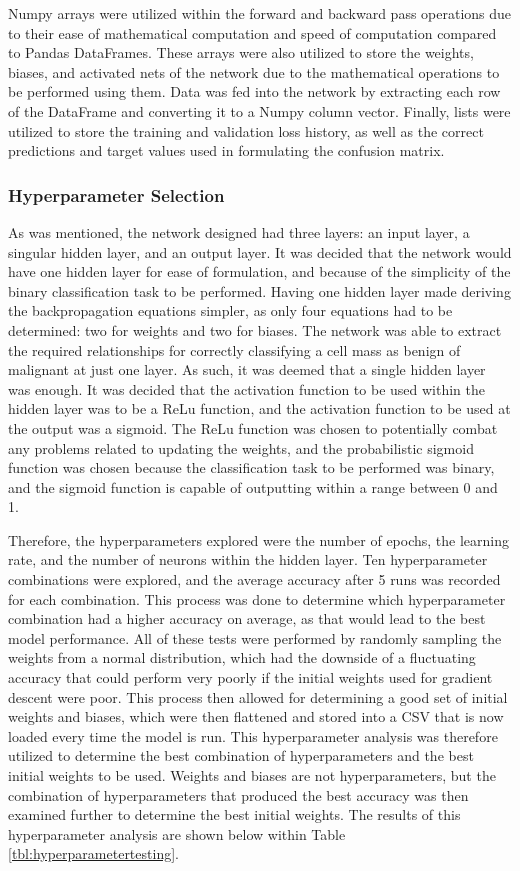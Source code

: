\documentclass[a4paper]{article}
\begin{document}
Numpy arrays were utilized within the forward and backward pass operations due to their ease of mathematical computation and speed of computation compared to Pandas DataFrames. These arrays were also utilized to store the weights, biases, and activated nets of the network due to the mathematical operations to be performed using them. Data was fed into the network by extracting each row of the DataFrame and converting it to a Numpy column vector. Finally, lists were utilized to store the training and validation loss history, as well as the correct predictions and target values used in formulating the confusion matrix.

\subsubsection{Hyperparameter Selection}\label{ANNhyperparameterselection}

As was mentioned, the network designed had three layers: an input layer, a singular hidden layer, and an output layer. It was decided that the network would have one hidden layer for ease of formulation, and because of the simplicity of the binary classification task to be performed. Having one hidden layer made deriving the backpropagation equations simpler, as only four equations had to be determined: two for weights and two for biases. The network was able to extract the required relationships for correctly classifying a cell mass as benign of malignant at just one layer. As such, it was deemed that a single hidden layer was enough. It was decided that the activation function to be used within the hidden layer was to be a ReLu function, and the activation function to be used at the output was a sigmoid. The ReLu function was chosen to potentially combat any problems related to updating the weights, and the probabilistic sigmoid function was chosen because the classification task to be performed was binary, and the sigmoid function is capable of outputting within a range between 0 and 1. 

Therefore, the hyperparameters explored were the number of epochs, the learning rate, and the number of neurons within the hidden layer. Ten hyperparameter combinations were explored, and the average accuracy after 5 runs was recorded for each combination. This process was done to determine which hyperparameter combination had a higher accuracy on average, as that would lead to the best model performance. All of these tests were performed by randomly sampling the weights from a normal distribution, which had the downside of a fluctuating accuracy that could perform very poorly if the initial weights used for gradient descent were poor. This process then allowed for determining a good set of initial weights and biases, which were then flattened and stored into a CSV that is now loaded every time the model is run. This hyperparameter analysis was therefore utilized to determine the best combination of hyperparameters and the best initial weights to be used. Weights and biases are not hyperparameters, but the combination of hyperparameters that produced the best accuracy was then examined further to determine the best initial weights. The results of this hyperparameter analysis are shown below within Table \ref{tbl:hyperparametertesting}.
\end{document}
